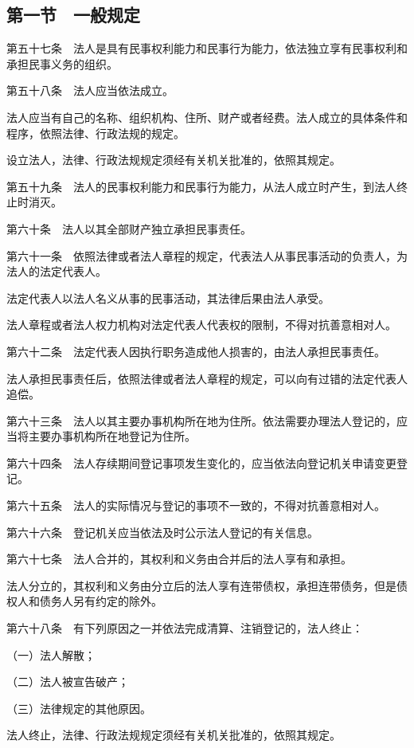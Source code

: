 \documentclass[UTF8,12pt,a4paper]{ctexbook}
\begin{document}
\subsection*{第一节　一般规定}

第五十七条　法人是具有民事权利能力和民事行为能力，依法独立享有民事权利和承担民事义务的组织。

第五十八条　法人应当依法成立。

法人应当有自己的名称、组织机构、住所、财产或者经费。法人成立的具体条件和程序，依照法律、行政法规的规定。

设立法人，法律、行政法规规定须经有关机关批准的，依照其规定。

第五十九条　法人的民事权利能力和民事行为能力，从法人成立时产生，到法人终止时消灭。

第六十条　法人以其全部财产独立承担民事责任。

第六十一条　依照法律或者法人章程的规定，代表法人从事民事活动的负责人，为法人的法定代表人。

法定代表人以法人名义从事的民事活动，其法律后果由法人承受。

法人章程或者法人权力机构对法定代表人代表权的限制，不得对抗善意相对人。

第六十二条　法定代表人因执行职务造成他人损害的，由法人承担民事责任。

法人承担民事责任后，依照法律或者法人章程的规定，可以向有过错的法定代表人追偿。

第六十三条　法人以其主要办事机构所在地为住所。依法需要办理法人登记的，应当将主要办事机构所在地登记为住所。

第六十四条　法人存续期间登记事项发生变化的，应当依法向登记机关申请变更登记。

第六十五条　法人的实际情况与登记的事项不一致的，不得对抗善意相对人。

第六十六条　登记机关应当依法及时公示法人登记的有关信息。

第六十七条　法人合并的，其权利和义务由合并后的法人享有和承担。

法人分立的，其权利和义务由分立后的法人享有连带债权，承担连带债务，但是债权人和债务人另有约定的除外。

第六十八条　有下列原因之一并依法完成清算、注销登记的，法人终止：

（一）法人解散；

（二）法人被宣告破产；

（三）法律规定的其他原因。

法人终止，法律、行政法规规定须经有关机关批准的，依照其规定。
\end{document}
